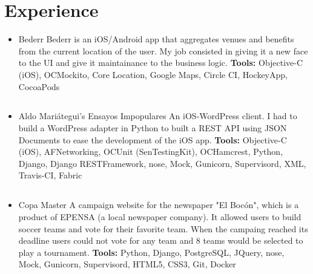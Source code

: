 \documentclass[11pt,a4paper,english]{moderncv}
\begin{document}
\maketitle

\section{Experience}

{
\begin{itemize}
    \item Bederr
        \newline{}
        Bederr is an iOS/Android app that aggregates venues and benefits from the current location of the user. My job consisted in giving it a new face to the UI and give it maintainance to the business logic.
        \newline{}
        \textbf{Tools:} Objective-C (iOS), OCMockito, Core Location, Google Maps, Circle CI, HockeyApp, CocoaPods
\end{itemize}
}

\subsection{}

{
\begin{itemize}
    \item Aldo Mariátegui's Ensayos Impopulares
        \newline{}
        An iOS-WordPress client. I had to build a WordPress adapter in Python to built a REST API using JSON Documents to ease the development of the iOS app.
        \newline{}
        \textbf{Tools:} Objective-C (iOS), AFNetworking, OCUnit (SenTestingKit), OCHamcrest, Python, Django, Django RESTFramework, nose, Mock, Gunicorn, Supervisord, XML, Travis-CI, Fabric
\end{itemize}
}

\subsection{}

{
\begin{itemize}
    \item Copa Master
        \newline{}
        A campaign website for the newspaper "El Bocón", which is a product of EPENSA (a local newspaper company). It allowed users to build soccer teams and vote for their favorite team. When the campaing reached its deadline users could not vote for any team and 8 teams would be selected to play a tournament.
        \newline{}
        \textbf{Tools:} Python, Django, PostgreSQL, JQuery, nose, Mock, Gunicorn, Supervisord, HTML5, CSS3, Git, Docker
\end{itemize}
}
\end{document}
